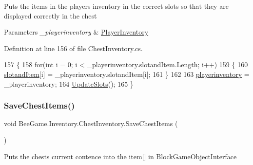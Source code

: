 Puts the items in the players inventory in the correct slots so that they are displayed correctly in the chest 


\begin{DoxyParams}{Parameters}
{\em \+\_\+playerinventory} & \hyperlink{class_bee_game_1_1_inventory_1_1_player_inventory}{Player\+Inventory}\\
\hline
\end{DoxyParams}


Definition at line 156 of file Chest\+Inventory.\+cs.


\begin{DoxyCode}
157         \{
158             \textcolor{keywordflow}{for}(\textcolor{keywordtype}{int} i = 0; i < \_playerinventory.slotandItem.Length; i++)
159             \{
160                 \hyperlink{class_bee_game_1_1_inventory_1_1_inventory_base_a405502a6eabf14e1498d96dc8aff5e8d}{slotandItem}[i] = \_playerinventory.slotandItem[i];
161             \}
162 
163             \hyperlink{class_bee_game_1_1_inventory_1_1_chest_inventory_a79ff450013724b84c1c21858c63404b0}{playerinventory} = \_playerinventory;
164             \hyperlink{class_bee_game_1_1_inventory_1_1_inventory_base_ac8edbffe8b164d66297c127654c844c4}{UpdateSlots}();
165         \}
\end{DoxyCode}
\mbox{\label{class_bee_game_1_1_inventory_1_1_chest_inventory_a3e9326154a7f2602ba03bd6b21aba93f}} 
\subsubsection{\texorpdfstring{Save\+Chest\+Items()}{SaveChestItems()}}
{\footnotesize\ttfamily void Bee\+Game.\+Inventory.\+Chest\+Inventory.\+Save\+Chest\+Items (\begin{DoxyParamCaption}{ }\end{DoxyParamCaption})\hspace{0.3cm}{\ttfamily [private]}}



Puts the chests current contence into the item\mbox{[}\mbox{]} in Block\+Game\+Object\+Interface 



